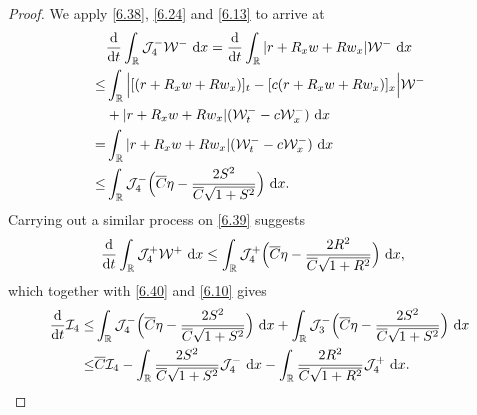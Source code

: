 \documentclass[11pt,reqno]{article}
\newcommand{\fr}{\frac}
\numberwithin{equation}{section}
\begin{document}
\begin{proof}
We apply \eqref{6.38}, \eqref{6.24} and \eqref{6.13} to arrive at
\begin{align}\label{6.40}
\begin{split}
&\fr{{\rm d}}{{\rm d}t}\int_{\mathbb{R}} \mathcal{J}_{4}^-\mathcal{W}^-\ {\rm d}x=\fr{{\rm d}}{{\rm d}t}\int_{\mathbb{R}}|r+R_xw+Rw_x|\mathcal{W}^-\ {\rm d}x \\
\leq &\int_{\mathbb{R}}\Big|[(r+R_xw+Rw_x)]_t -[c(r+R_xw+Rw_x)]_x\Big|\mathcal{W}^- \\ &+|r+R_xw+Rw_x|(\mathcal{W}^{-}_t-c\mathcal{W}^{-}_x)\ {\rm d}x \\
= &\int_{\mathbb{R}} |r+R_xw+Rw_x|(\mathcal{W}^{-}_t-c\mathcal{W}^{-}_x) \ {\rm d}x \\
\leq & \int_{\mathbb{R}} \mathcal{J}_{4}^- \Big(\overline{C}\eta-\fr{2S^2}{\overline{C}\sqrt{1+S^2}}\Big)\ {\rm d}x.
\end{split}
\end{align}
Carrying out a similar process on \eqref{6.39} suggests
\begin{align*}
\begin{split}
&\fr{{\rm d}}{{\rm d}t}\int_{\mathbb{R}} \mathcal{J}_{4}^+\mathcal{W}^+\ {\rm d}x
\leq  \int_{\mathbb{R}} \mathcal{J}_{4}^+ \Big(\overline{C}\eta-\fr{2R^2}{\overline{C}\sqrt{1+R^2}}\Big)\ {\rm d}x,
\end{split}
\end{align*}
which together with \eqref{6.40} and \eqref{6.10} gives
\begin{align}\label{6.41}
\begin{split}
\fr{{\rm d}}{{\rm d}t}\mathcal{I}_4
\leq & \int_{\mathbb{R}} \mathcal{J}_{4}^- \Big(\overline{C}\eta-\fr{2S^2}{\overline{C}\sqrt{1+S^2}}\Big)\ {\rm d}x +\int_{\mathbb{R}} \mathcal{J}_{3}^- \Big(\overline{C}\eta-\fr{2S^2}{\overline{C}\sqrt{1+S^2}}\Big)\ {\rm d}x \\
\leq & \overline{C}\mathcal{I}_4 -\int_{\mathbb{R}} \fr{2S^2}{\overline{C}\sqrt{1+S^2}}\mathcal{J}_{4}^-\ {\rm d}x -\int_{\mathbb{R}} \fr{2R^2}{\overline{C}\sqrt{1+R^2}}\mathcal{J}_{4}^+\ {\rm d}x.
\end{split}
\end{align}


\end{proof}
\end{document}

